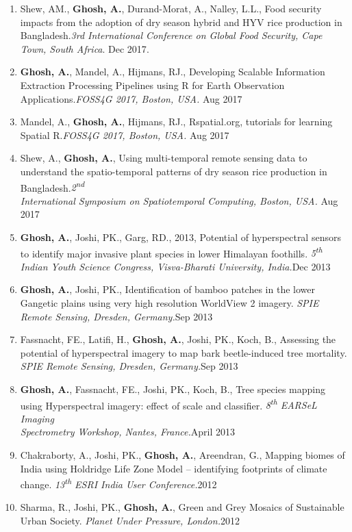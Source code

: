\documentclass[11pt]{article}
\makeatletter
\newlength{\bibhang}
\newlength{\bibsep}
 {\@listi \global\bibsep\itemsep \global\advance\bibsep by\parsep}
\newenvironment{bibsection}%
        {\begin{enumerate}{}{%
       \setlength{\leftmargin}{\bibhang}%
       \setlength{\itemindent}{-\leftmargin}%
       \setlength{\itemsep}{\bibsep}%
       \setlength{\parsep}{\z@}%
        \setlength{\partopsep}{0pt}%
        \setlength{\topsep}{0pt}}}
        {\end{enumerate}\vspace{-.6\baselineskip}}
\makeatother
\begin{document}
\begin{bibsection}
\hfill{Jan 2018}.
\item Shew, AM., {\bf Ghosh, A.}, Durand-Morat, A., Nalley, L.L., Food security impacts from the adoption of dry season hybrid and HYV rice production in Bangladesh.\emph{3rd International Conference on Global Food Security, Cape Town, South Africa}. 
\hfill{Dec 2017}.
\item {\bf Ghosh, A.}, Mandel, A., Hijmans, RJ., Developing Scalable Information Extraction Processing Pipelines using R for Earth Observation Applications.\emph{FOSS4G 2017, Boston, USA.} \hfill{Aug 2017}
\item Mandel, A., {\bf Ghosh, A.}, Hijmans, RJ., Rspatial.org, tutorials for learning Spatial R.\emph{FOSS4G 2017, Boston, USA.} \hfill{Aug 2017}
\item Shew, A., {\bf Ghosh, A.}, Using multi-temporal remote sensing data to understand the spatio-temporal patterns of dry season rice production in Bangladesh.\emph{2\textsuperscript{nd}\\ International Symposium on Spatiotemporal Computing, Boston, USA.} \hfill{Aug 2017}
\item {\bf Ghosh, A.}, Joshi, PK., Garg, RD., 2013, Potential	of hyperspectral sensors to	identify major invasive	plant	species	in lower Himalayan foothills. \emph{ 5\textsuperscript{th} Indian Youth Science Congress, Visva-Bharati University, India.}\hfill Dec 2013
\item {\bf Ghosh, A.}, Joshi, PK., Identification of bamboo patches in the lower Gangetic plains using very high resolution WorldView 2 imagery. \emph{SPIE Remote Sensing, Dresden, Germany.}\hfill Sep 2013
\item Fassnacht, FE., Latifi, H., {\bf Ghosh, A.}, Joshi, PK., Koch, B., Assessing the potential of hyperspectral imagery to map bark beetle-induced tree mortality. \emph{SPIE Remote Sensing, Dresden, Germany.}\hfill Sep 2013
\item {\bf Ghosh, A.}, Fassnacht, FE., Joshi, PK., Koch, B., Tree species	mapping using Hyperspectral	imagery: effect	of scale and classifier. \emph{ 8\textsuperscript{th} EARSeL Imaging\\ Spectrometry Workshop, Nantes, France.}\hfill April 2013
\item Chakraborty, A., Joshi, PK., {\bf Ghosh, A.}, Areendran, G., Mapping biomes of India using Holdridge Life Zone Model -- identifying footprints of climate change. \emph{13\textsuperscript{th} ESRI India User Conference.}\hfill 2012
\item Sharma, R., Joshi, PK., {\bf Ghosh, A.}, Green and Grey Mosaics of Sustainable Urban Society. \emph{Planet Under Pressure, London.}\hfill 2012

\end{bibsection}
\end{document}

